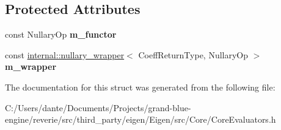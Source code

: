 \subsection*{Protected Attributes}
\begin{DoxyCompactItemize}
\item 
\mbox{\label{struct_eigen_1_1internal_1_1evaluator_3_01_cwise_nullary_op_3_01_nullary_op_00_01_plain_object_type_01_4_01_4_aa9f23a85180c147ab81089f0ed5d5c66}} 
const Nullary\+Op {\bfseries m\+\_\+functor}
\item 
\mbox{\label{struct_eigen_1_1internal_1_1evaluator_3_01_cwise_nullary_op_3_01_nullary_op_00_01_plain_object_type_01_4_01_4_af96c162c50512634ec276928f016824d}} 
const \mbox{\hyperlink{struct_eigen_1_1internal_1_1nullary__wrapper}{internal\+::nullary\+\_\+wrapper}}$<$ Coeff\+Return\+Type, Nullary\+Op $>$ {\bfseries m\+\_\+wrapper}
\end{DoxyCompactItemize}


The documentation for this struct was generated from the following file\+:\begin{DoxyCompactItemize}
\item 
C\+:/\+Users/dante/\+Documents/\+Projects/grand-\/blue-\/engine/reverie/src/third\+\_\+party/eigen/\+Eigen/src/\+Core/Core\+Evaluators.\+h\end{DoxyCompactItemize}
